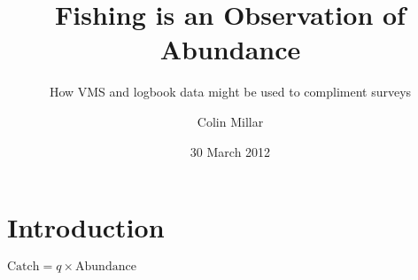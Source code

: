\documentclass{beamer}
\title{Fishing is an Observation of Abundance}
\subtitle{How VMS and logbook data might be used to compliment surveys}
\author[CP Millar]{Colin Millar}
\institute[JRC]{European Commission\\ Joint Research Center}
\date[Sketch 2012]{30 March 2012}
\begin{document}


\begin{frame}
\titlepage
\end{frame}

\section{Introduction}
\label{sec:introduction}

\begin{frame}
\begin{center}
\LARGE \textbf{$\text{Catch} = q \times \text{Abundance}$}
\end{center}
\end{frame}
\end{document}
